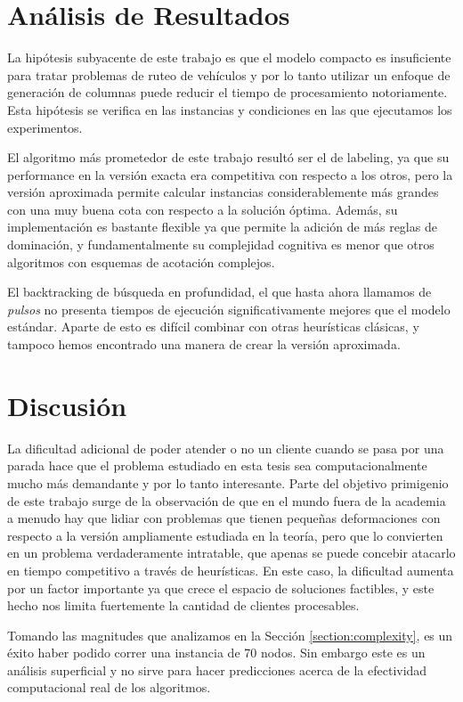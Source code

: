 \section{Análisis de Resultados}

La hipótesis subyacente de este trabajo es que el modelo compacto es insuficiente para tratar problemas de ruteo de vehículos y por lo tanto utilizar un enfoque de generación de columnas puede reducir el tiempo de procesamiento notoriamente. Esta hipótesis se verifica en las instancias y condiciones en las que ejecutamos los experimentos.

El algoritmo más prometedor de este trabajo resultó ser el de labeling, ya que su performance en la versión exacta era competitiva con respecto a los otros, pero la versión aproximada permite calcular instancias considerablemente más grandes con una muy buena cota con respecto a la solución óptima. Además,  su implementación es bastante flexible ya que permite la adición de más reglas de dominación, y fundamentalmente su complejidad cognitiva es menor que otros algoritmos con esquemas de acotación complejos.

El backtracking de búsqueda en profundidad, el que hasta ahora llamamos de \emph{pulsos} no presenta tiempos de ejecución significativamente mejores que el modelo estándar. Aparte de esto es difícil combinar con otras heurísticas clásicas, y tampoco hemos encontrado una manera de crear la versión aproximada.


\section{Discusión}

La dificultad adicional de poder atender o no un cliente cuando se pasa por una parada hace que el problema estudiado en esta tesis sea computacionalmente mucho más demandante y por lo tanto interesante. Parte del objetivo primigenio de este trabajo surge de la observación de que en el mundo fuera de la academia a menudo hay que lidiar con problemas que tienen pequeñas deformaciones con respecto a la versión ampliamente estudiada en la teoría, pero que lo convierten en un problema verdaderamente intratable, que apenas se puede concebir atacarlo en tiempo competitivo a través de heurísticas. En este caso, la dificultad aumenta por un factor importante ya que crece el espacio de soluciones factibles, y este hecho nos limita fuertemente la cantidad de clientes procesables.

Tomando las magnitudes que analizamos en la Sección \ref{section:complexity}, es un éxito haber podido correr una instancia de 70 nodos. Sin embargo este es un análisis superficial y no sirve para hacer predicciones acerca de la efectividad computacional real de los algoritmos. 

